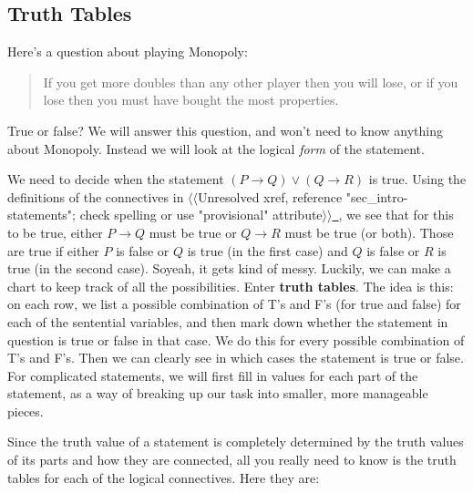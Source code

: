 \documentclass[10pt,]{book}
\newcommand{\terminology}[1]{\textbf{#1}}
\theoremstyle{plain}
\theoremstyle{definition}
\theoremstyle{definition}
\theoremstyle{definition}
\theoremstyle{definition}
\numberwithin{equation}{chapter}
\def\imp{\rightarrow}
\begin{document}
\subsection[{Truth Tables}]{Truth Tables}\label{subsection-38}
\hypertarget{p-1895}{}%
Here's a question about playing Monopoly:%
\begin{quote}\hypertarget{blockquote-10}{}
\hypertarget{p-1896}{}%
If you get more doubles than any other player then you will lose, or if you lose then you must have bought the most properties.%
\end{quote}
\hypertarget{p-1897}{}%
True or false? We will answer this question, and won't need to know anything about Monopoly. Instead we will look at the logical \emph{form} of the statement.%
\par
\hypertarget{p-1898}{}%
We need to decide when the statement \((P \imp Q) \vee (Q \imp R)\) is true. Using the definitions of the connectives in {$\langle\langle$Unresolved xref, reference "sec\_intro-statements"; check spelling or use "provisional" attribute$\rangle\rangle$}\hyperlink{}{~}, we see that for this to be true, either \(P \imp Q\) must be true or \(Q \imp R\) must be true (or both). Those are true if either \(P\) is false or \(Q\) is true (in the first case) and \(Q\) is false or \(R\) is true (in the second case). So\textemdash{}yeah, it gets kind of messy. Luckily, we can make a chart to keep track of all the possibilities. Enter \terminology{truth tables}. The idea is this: on each row, we list a possible combination of T's and F's (for true and false) for each of the sentential variables, and then mark down whether the statement in question is true or false in that case. We do this for every possible combination of T's and F's. Then we can clearly see in which cases the statement is true or false. For complicated statements, we will first fill in values for each part of the statement, as a way of breaking up our task into smaller, more manageable pieces.%
\par
\hypertarget{p-1899}{}%
Since the truth value of a statement is completely determined by the truth values of its parts and how they are connected, all you really need to know is the truth tables for each of the logical connectives. Here they are:%
\end{document}
